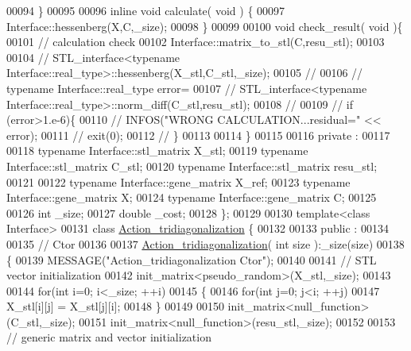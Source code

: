 \begin{DoxyCode}
00094   \}
00095 
00096   \textcolor{keyword}{inline} \textcolor{keywordtype}{void} calculate( \textcolor{keywordtype}{void} ) \{
00097       Interface::hessenberg(X,C,\_size);
00098   \}
00099 
00100   \textcolor{keywordtype}{void} check\_result( \textcolor{keywordtype}{void} )\{
00101     \textcolor{comment}{// calculation check}
00102     Interface::matrix\_to\_stl(C,resu\_stl);
00103 
00104 \textcolor{comment}{//     STL\_interface<typename Interface::real\_type>::hessenberg(X\_stl,C\_stl,\_size);}
00105 \textcolor{comment}{//}
00106 \textcolor{comment}{//     typename Interface::real\_type error=}
00107 \textcolor{comment}{//       STL\_interface<typename Interface::real\_type>::norm\_diff(C\_stl,resu\_stl);}
00108 \textcolor{comment}{//}
00109 \textcolor{comment}{//     if (error>1.e-6)\{}
00110 \textcolor{comment}{//       INFOS("WRONG CALCULATION...residual=" << error);}
00111 \textcolor{comment}{//       exit(0);}
00112 \textcolor{comment}{//     \}}
00113 
00114   \}
00115 
00116 private :
00117 
00118   \textcolor{keyword}{typename} Interface::stl\_matrix X\_stl;
00119   \textcolor{keyword}{typename} Interface::stl\_matrix C\_stl;
00120   \textcolor{keyword}{typename} Interface::stl\_matrix resu\_stl;
00121 
00122   \textcolor{keyword}{typename} Interface::gene\_matrix X\_ref;
00123   \textcolor{keyword}{typename} Interface::gene\_matrix X;
00124   \textcolor{keyword}{typename} Interface::gene\_matrix C;
00125 
00126   \textcolor{keywordtype}{int} \_size;
00127   \textcolor{keywordtype}{double} \_cost;
00128 \};
00129 
00130 \textcolor{keyword}{template}<\textcolor{keyword}{class} Interface>
00131 \textcolor{keyword}{class }\hyperlink{class_action__tridiagonalization}{Action\_tridiagonalization} \{
00132 
00133 public :
00134 
00135   \textcolor{comment}{// Ctor}
00136 
00137   \hyperlink{class_action__tridiagonalization}{Action\_tridiagonalization}( \textcolor{keywordtype}{int} size ):\_size(size)
00138   \{
00139     MESSAGE(\textcolor{stringliteral}{"Action\_tridiagonalization Ctor"});
00140 
00141     \textcolor{comment}{// STL vector initialization}
00142     init\_matrix<pseudo\_random>(X\_stl,\_size);
00143     
00144     \textcolor{keywordflow}{for}(\textcolor{keywordtype}{int} i=0; i<\_size; ++i)
00145     \{
00146       \textcolor{keywordflow}{for}(\textcolor{keywordtype}{int} j=0; j<i; ++j)
00147         X\_stl[i][j] = X\_stl[j][i];
00148     \}
00149     
00150     init\_matrix<null\_function>(C\_stl,\_size);
00151     init\_matrix<null\_function>(resu\_stl,\_size);
00152 
00153     \textcolor{comment}{// generic matrix and vector initialization}

\end{DoxyCode}
